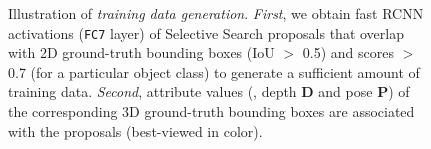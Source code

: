 \documentclass[10pt,twocolumn,letterpaper]{article}
\begin{document}
\begin{figure}
\caption{Illustration of \emph{training data generation}. \emph{First}, 
we obtain fast RCNN \cite{Girshick15a} activations (\texttt{FC7} layer)
of Selective Search \cite{Uijlings13a} proposals  
that overlap with 2D ground-truth bounding boxes (IoU $>$ 0.5) 
and scores $>$ 0.7 (for a particular object class) 
to generate a sufficient amount of training data. 
\emph{Second}, attribute values (\ie, depth \textbf{D} and pose 
\textbf{P}) 
of the corresponding 3D ground-truth bounding boxes are 
associated with the proposals (best-viewed in color). \label{fig:trainingdata}}
\end{figure}
\end{document}
